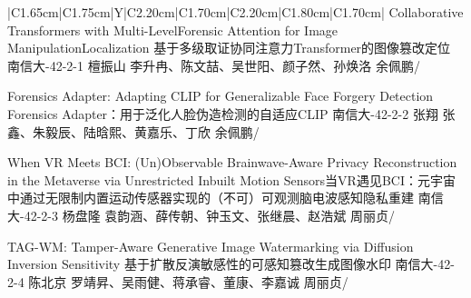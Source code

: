 \Needspace{7.5cm}
\begin{tabularx}{\textwidth}{|C{1.65cm}|C{1.75cm}|Y|C{2.20cm}|C{1.70cm}|C{2.20cm}|C{1.80cm}|C{1.70cm}|}
\HeaderRow
{}
{Collaborative Transformers with Multi-LevelForensic Attention for Image ManipulationLocalization\newline
基于多级取证协同注意力Transformer的图像篡改定位}
{南信大-42-2-1}
{檀振山}
{李升冉、陈文喆、吴世阳、颜子然、孙焕洛}
{余佩鹏}{/}

{Forensics Adapter: Adapting CLIP for Generalizable Face Forgery Detection \newline Forensics Adapter：用于泛化人脸伪造检测的自适应CLIP}
{南信大-42-2-2}
{张翔}
{张鑫、朱毅辰、陆晗熙、黄嘉乐、丁欣}
{余佩鹏}{/}


{When VR Meets BCI: (Un)Observable Brainwave-Aware Privacy Reconstruction in the Metaverse via Unrestricted Inbuilt Motion Sensors\newline 当VR遇见BCI：元宇宙中通过无限制内置运动传感器实现的（不可）可观测脑电波感知隐私重建}
{南信大-42-2-3}
{杨盘隆}
{袁韵涵、薛传朝、钟玉文、张继晨、赵浩斌}
{周丽贞}{/}

{TAG-WM: Tamper-Aware Generative Image Watermarking via Diffusion Inversion Sensitivity \newline 基于扩散反演敏感性的可感知篡改生成图像水印}
{南信大-42-2-4}
{陈北京}
{罗靖昇、吴雨健、蒋承睿、董康、李嘉诚}
{周丽贞}{/}
\end{tabularx}
\BlockGap


